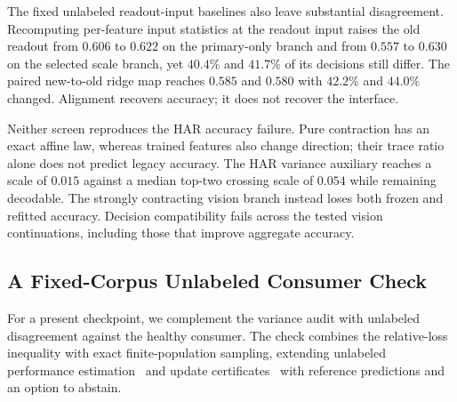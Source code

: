 \documentclass{article}
\begin{document}
The fixed unlabeled readout-input baselines also leave substantial disagreement. Recomputing per-feature input
statistics at the readout input raises the old readout from $0.606$ to $0.622$
on the primary-only branch and from $0.557$ to $0.630$ on the selected scale
branch, yet $40.4\%$ and $41.7\%$ of its decisions still differ. The paired
new-to-old ridge map reaches $0.585$ and
$0.580$ with $42.2\%$ and $44.0\%$ changed. Alignment recovers accuracy; it does
not recover the interface.

Neither screen reproduces the HAR accuracy failure. Pure contraction has an
exact affine law, whereas trained features also change direction; their trace
ratio alone does not predict legacy accuracy. The HAR variance auxiliary reaches
a scale of $0.015$ against a median top-two crossing scale of $0.054$ while
remaining decodable. The strongly contracting vision branch instead loses both
frozen and refitted accuracy. Decision compatibility fails across the tested
vision continuations, including those that improve aggregate accuracy.



\subsection{A Fixed-Corpus Unlabeled Consumer Check}\label{app:consumer_audit}

For a present checkpoint, we complement the variance audit with unlabeled disagreement against the healthy consumer. The check combines the relative-loss inequality with exact finite-population sampling, extending unlabeled performance estimation~\citep{garg2022unlabeled} and update certificates~\citep{usama2026envelopes} with reference predictions and an option to abstain.
\end{document}
